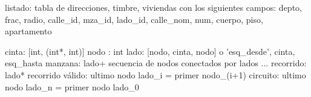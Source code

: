 listado: tabla de direcciones, timbre, viviendas con los siguientes campos:
depto, frac, radio, calle_id, mza_id, lado_id, calle_nom, num, cuerpo, piso, apartamento 

cinta: [int, (int*, int)]
nodo : int
lado: [nodo, cinta, nodo] o {'esq_desde', cinta, esq_hasta}
manzana: lado+ secuencia de nodos conectados por lados ...
recorrido: lado*
recorrido válido: ultimo nodo lado_i = primer nodo_(i+1)
circuito: ultimo nodo lado_n = primer nodo lado_0


